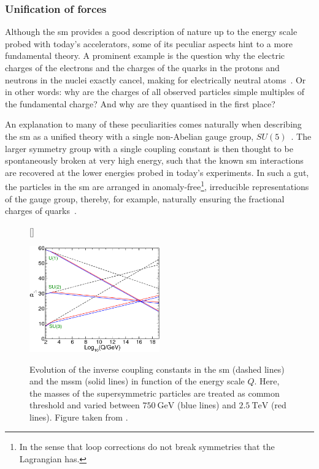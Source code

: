 \subsubsection{Unification of forces}


Although the \gls{sm} provides a good description of nature up to the energy scale probed with today's accelerators, some of its peculiar aspects hint to a more fundamental theory. A prominent example is the question why the electric charges of the electrons and the charges of the quarks in the protons and neutrons in the nuclei exactly cancel, making for electrically neutral atoms~\cite{Brock:1354959}. Or in other words: why are the charges of all observed particles simple multiples of the fundamental charge? And why are they quantised in the first place?

An explanation to many of these peculiarities comes naturally when describing the \gls{sm} as a unified theory with a single non-Abelian gauge group, \eg $SU(5)$~\cite{PhysRevLett.32.438}. The larger symmetry group with a single coupling constant is then thought to be spontaneously broken at very high energy, such that the known \gls{sm} interactions are recovered at the lower energies probed in today's experiments. In such a \gls{gut}, the particles in the \gls{sm} are arranged in anomaly-free\footnote{In the sense that loop corrections do not break symmetries that the Lagrangian has.}, irreducible representations of the gauge group, thereby, for example, naturally ensuring the fractional charges of quarks~\cite{Peskin:1995ev}.

\begin{figure}
[\FBwidth]
{\caption{Evolution of the inverse coupling constants in the \gls{sm} (dashed lines) and the \gls{mssm} (solid lines) in function of the energy scale $Q$. Here, the masses of the supersymmetric particles are treated as common threshold and varied between $\SI{750}{\GeV}$ (blue lines) and $\SI{2.5}{\TeV}$ (red lines). Figure taken from \cite{Martin:1997ns}.}\label{fig:unification_forces}}
{\includegraphics[width=0.5\textwidth]{unification}}
\end{figure}


